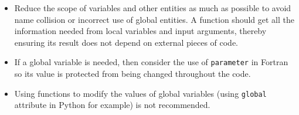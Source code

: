 \begin{IN}
    \begin{itemize}
        \item Reduce the scope of variables and other entities as much as possible to avoid name collision or incorrect use of global entities. 
        A function should get all the information needed from local variables and input arguments, 
        thereby ensuring its result does not depend on external pieces of code.
        
        \item If a global variable is needed, then consider the use of \texttt{parameter} in Fortran so its value is protected from being changed throughout the code. 
        
        \item Using functions to modify the values of global variables (using \texttt{global} attribute in Python for example) is not recommended. 
    \end{itemize}    
\end{IN}












%
%
%










